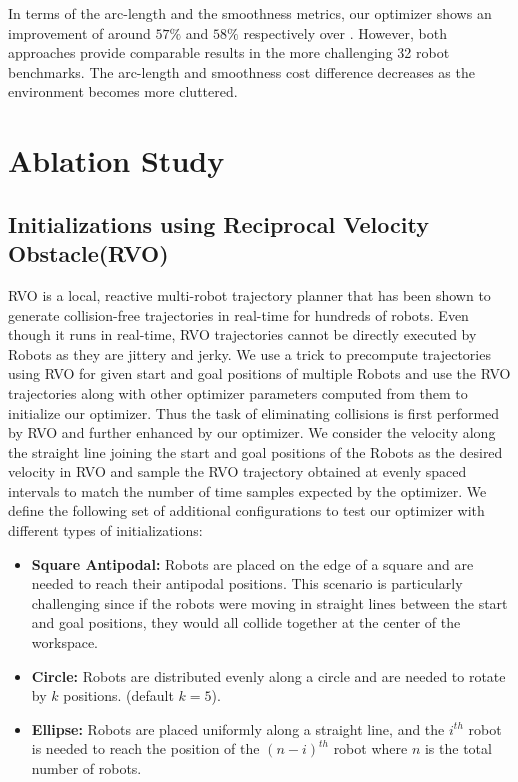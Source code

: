In terms of the arc-length and the smoothness metrics, our optimizer shows an improvement of around $57 \%$ and $58\%$ respectively over \citep{aks_ral21}. However, both approaches provide comparable results in the more challenging 32 robot benchmarks. The arc-length and smoothness cost difference decreases as the environment becomes more cluttered. 


\section{Ablation Study}

\subsection{Initializations using Reciprocal Velocity Obstacle(RVO)\cite{RVO}}\label{sec:appendix-RVO}

RVO is a local, reactive multi-robot trajectory planner that has been shown to generate collision-free trajectories in real-time for hundreds of robots\cite{RVO}. Even though it runs in real-time, RVO trajectories cannot be directly executed by Robots as they are jittery and jerky. We use a trick to precompute trajectories using RVO for given start and goal positions of multiple Robots and use the RVO trajectories along with other optimizer parameters computed from them to initialize our optimizer. Thus the task of eliminating collisions is first performed by RVO and further enhanced by our optimizer. We consider the velocity along the straight line joining the start and goal positions of the Robots as the desired velocity in RVO and sample the RVO trajectory obtained at evenly spaced intervals to match the number of time samples expected by the optimizer. We define the following set of additional configurations to test our optimizer with different types of initializations:

\begin{itemize}
  \item \textbf{Square Antipodal:}
  Robots are placed on the edge of a square and are needed to reach their antipodal positions. This scenario is particularly challenging since if the robots were moving in straight lines between the start and goal positions, they would all collide together at the center of the workspace.
  \item \textbf{Circle:}
  Robots are distributed evenly along a circle and are needed to rotate by $k$ positions. (default $k=5$).
  \item \textbf{Ellipse:}
  Robots are placed uniformly along a straight line, and the $i^{th}$ robot is needed to reach the position of the $(n-i)^{th}$ robot where $n$ is the total number of robots.
\end{itemize}

